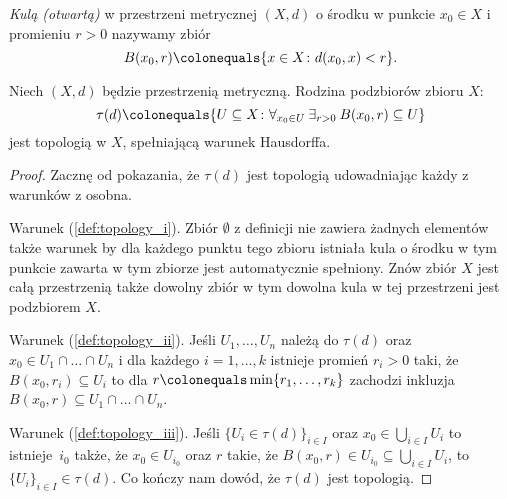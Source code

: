 {\begin{definition}[Kula]
        \emph{Kulą (otwartą)} w przestrzeni metrycznej $(X, d)$ o środku w punkcie $x_0\in X$ i promieniu $r > 0$ nazywamy zbiór
        \begin{equation}
            B(x_0, r) \colonequals \{x\in X\colon d(x_0, x) < r\}.
        \end{equation}
    \end{definition}
    \begin{theorem}
        Niech $(X, d)$ będzie przestrzenią metryczną. Rodzina podzbiorów zbioru $X$:
        \begin{equation}
            \label{eq:metric_topology}
            \tau(d) \colonequals \{U\subseteq X\colon\nforall{x_0\in U}\nexists{r>0} B(x_0, r)\subseteq U\}
        \end{equation}
        jest topologią w $X$, spełniającą warunek Hausdorffa.
    \end{theorem}
    \begin{proof}
        Zacznę od pokazania, że $\tau(d)$ jest topologią udowadniając każdy z warunków z osobna.
        
        Warunek (\ref{def:topology_i}). Zbiór $\emptyset$ z definicji nie zawiera żadnych elementów także warunek by dla każdego punktu tego zbioru istniała kula o środku w tym punkcie zawarta w tym zbiorze jest automatycznie spełniony. Znów zbiór $X$ jest całą przestrzenią także dowolny zbiór w tym dowolna kula w tej przestrzeni jest podzbiorem $X$.
                
        Warunek (\ref{def:topology_ii}). Jeśli $U_1,\ldots,U_n$ należą do $\tau(d)$ oraz $x_0\in U_1\cap\ldots\cap U_n$ i dla każdego $i = 1, \ldots, k$ istnieje promień $r_i > 0$ taki, że $B(x_0, r_i) \subseteq U_i$ to dla $r\colonequals\min\{r_1,\ldots,r_k\}$ zachodzi inkluzja $B(x_0, r)\subseteq U_1\cap\ldots\cap U_n$. 
        
        Warunek (\ref{def:topology_iii}). Jeśli $\{U_i\in\tau(d)\}_{i\in I}$ oraz $x_0\in\bigcup_{i\in I}U_i$ to istnieje~$i_0$ także, że $x_0\in U_{i_0}$ oraz $r$ takie, że $B(x_0, r)\in U_{i_0}\subseteq \bigcup_{i\in I}U_i $, to $\{U_i\}_{i\in I}\in \tau(d)$. Co kończy nam dowód, że $\tau(d)$ jest topologią. 
        

\end{proof}}
